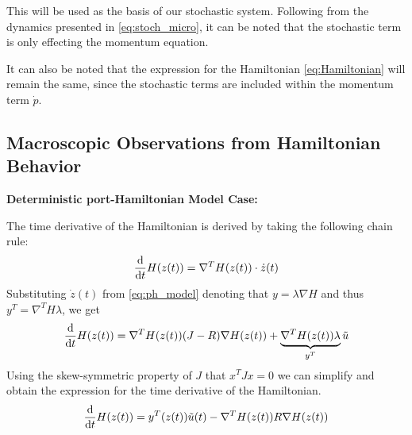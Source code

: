 This will be used as the basis of our stochastic system. Following from the dynamics presented in \autoref{eq:stoch_micro}, it can be noted that the stochastic term is only effecting the momentum equation.

It can also be noted that the expression for the Hamiltonian \autoref{eq:Hamiltonian} will remain the same, since the stochastic terms are included within the momentum term $\dot p$. 

\subsection{Macroscopic Observations from Hamiltonian Behavior}
\label{section:stoch_derivative}
\textbf{Deterministic port-Hamiltonian Model Case:}

The time derivative of the Hamiltonian is derived by taking the following chain rule:
\begin{align*}
    \dfrac{\mathrm d }{\mathrm d t}H(z(t)) = \nabla^T H(z(t))\cdot \dot z(t)
\end{align*}
Substituting $\dot z(t)$ from \autoref{eq:ph_model} denoting that $y = \lambda \nabla H$ and thus $y^T = \nabla^T H \lambda$, we get
\begin{align*}
    \dfrac{\mathrm d }{\mathrm d t}H(z(t)) = \nabla^T H(z(t))(J-R)\nabla H(z(t)) + \underbrace{\nabla^T H(z(t)) \lambda}_{y^T} \tilde u
\end{align*}
Using the skew-symmetric property of $J$ that $x^TJx=0$ we can simplify and obtain the expression for the time derivative of the Hamiltonian.
\begin{align}
    \frac{\mathrm d }{\mathrm d t}H(z(t)) = y^T(z(t))\tilde u(t) - \nabla^T H(z(t))R \nabla H(z(t))
\end{align}

